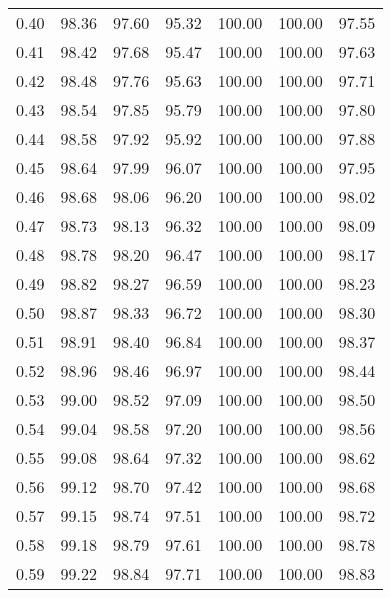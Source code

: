 \begin{tabular}{|c|c|c|c|c|c|c|}
      0.40 &     98.36 &     97.60 &      95.32 &  100.00 &     100.00 &         97.55 \\
      0.41 &     98.42 &     97.68 &      95.47 &  100.00 &     100.00 &         97.63 \\
      0.42 &     98.48 &     97.76 &      95.63 &  100.00 &     100.00 &         97.71 \\
      0.43 &     98.54 &     97.85 &      95.79 &  100.00 &     100.00 &         97.80 \\
      0.44 &     98.58 &     97.92 &      95.92 &  100.00 &     100.00 &         97.88 \\
      0.45 &     98.64 &     97.99 &      96.07 &  100.00 &     100.00 &         97.95 \\
      0.46 &     98.68 &     98.06 &      96.20 &  100.00 &     100.00 &         98.02 \\
      0.47 &     98.73 &     98.13 &      96.32 &  100.00 &     100.00 &         98.09 \\
      0.48 &     98.78 &     98.20 &      96.47 &  100.00 &     100.00 &         98.17 \\
      0.49 &     98.82 &     98.27 &      96.59 &  100.00 &     100.00 &         98.23 \\
      0.50 &     98.87 &     98.33 &      96.72 &  100.00 &     100.00 &         98.30 \\
      0.51 &     98.91 &     98.40 &      96.84 &  100.00 &     100.00 &         98.37 \\
      0.52 &     98.96 &     98.46 &      96.97 &  100.00 &     100.00 &         98.44 \\
      0.53 &     99.00 &     98.52 &      97.09 &  100.00 &     100.00 &         98.50 \\
      0.54 &     99.04 &     98.58 &      97.20 &  100.00 &     100.00 &         98.56 \\
      0.55 &     99.08 &     98.64 &      97.32 &  100.00 &     100.00 &         98.62 \\
      0.56 &     99.12 &     98.70 &      97.42 &  100.00 &     100.00 &         98.68 \\
      0.57 &     99.15 &     98.74 &      97.51 &  100.00 &     100.00 &         98.72 \\
      0.58 &     99.18 &     98.79 &      97.61 &  100.00 &     100.00 &         98.78 \\
      0.59 &     99.22 &     98.84 &      97.71 &  100.00 &     100.00 &         98.83 \\

\end{tabular}
